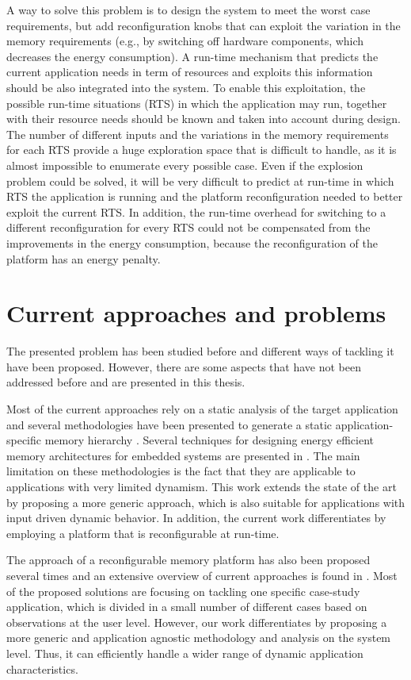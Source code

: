 A way to solve this problem is to design the system to meet the worst case requirements, but add reconfiguration knobs that can exploit the variation in the memory requirements (e.g., by switching off hardware components, which decreases the energy consumption).
A run-time mechanism that predicts the current application needs in term of resources and exploits this information should be also integrated into the system.
To enable this exploitation, the possible run-time situations (RTS)  in which the application may run, together with their resource needs should be known and taken into account during design. 
The number of different inputs and the variations in the memory requirements for each RTS provide a huge exploration space that is difficult to handle, as it is almost impossible to enumerate every possible case.
Even if the explosion problem could be solved, it will be very difficult to predict at run-time in which RTS the application is running and the platform reconfiguration needed to better exploit the current RTS. 
In addition, the run-time overhead for switching to a different reconfiguration for every RTS could not be  compensated from the improvements in the energy consumption, because the reconfiguration of the platform has an energy penalty. 

\section{Current approaches and problems}

The presented problem has been studied before and different ways of tackling it have been proposed.
However, there are some aspects that have not been addressed before and are presented in this thesis.

Most of the current approaches rely on a static analysis of the target application and several methodologies have been presented to generate a static application-specific memory hierarchy \cite{Ben00b}.
Several techniques for designing energy efficient memory architectures for embedded systems are presented in \cite{Mac02}. 
The main limitation on these methodologies is the fact that they are applicable to applications with very limited dynamism. 
This work extends the state of the art by proposing a more generic approach, which is also suitable for applications with input driven dynamic behavior.  
In addition, the current work differentiates by employing a platform that is reconfigurable at run-time.
 
The approach of a reconfigurable memory platform has also been proposed several times and an extensive overview of current approaches is found in \cite{Garcia}.
Most of the proposed solutions are focusing on tackling one specific case-study application, which is divided in a small number of different cases based on observations at the user level.
However, our work differentiates by proposing a more generic and application agnostic methodology and analysis on the system level.
Thus, it can efficiently handle a wider range of dynamic application characteristics.

